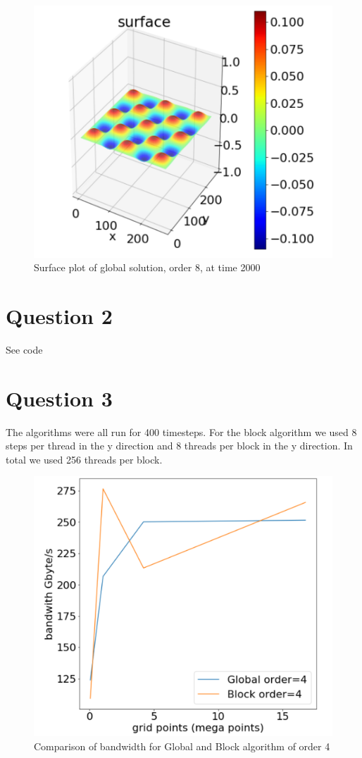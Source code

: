 \begin{figure}[!ht]
	\centering
	\includegraphics[scale=0.5]{surf_2.pdf}
	\caption{Surface plot of global solution, order 8, at time 2000}
\end{figure}


\section{Question 2}
See code

\section{Question 3}
The algorithms were all run for 400 timesteps. For the block algorithm we used 8 steps per thread in the y direction and 8 threads per block in the y direction. In total we used 256 threads per block.
\begin{figure}[!ht]
	\centering
	\includegraphics[scale=0.5]{graph_alg.pdf}
	\caption{Comparison of bandwidth for Global and Block algorithm of order 4}
\end{figure}


